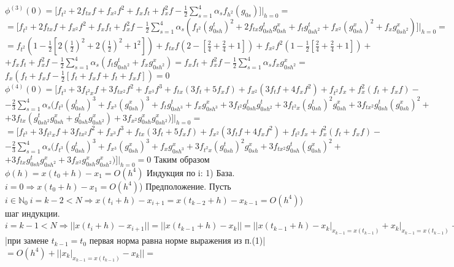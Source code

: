\documentclass[a4paper,14pt]{article}
\begin{document}
$\phi^{(3)}(0)=\bigg[f_{t^2}+2f_{tx}f+f_{x^2}f^2+f_xf_t+f_x^2f- \frac{1}{2}\sum\limits_{s=1}^{4}\alpha_sf_{h^2}(g_{0s})\bigg]\bigg|_{h=0}=$\newline
$=\bigg[f_{t^2}+2f_{tx}f+f_{x^2}f^2+f_xf_t+f_x^2f- \frac{1}{2}\sum\limits_{s=1}^{4}\alpha_s(f_{t^2}(g_{0sh}^t)^2+2f_{tx}g_{0sh}^tg_{0sh}^x+f_tg_{0sh^2}^t+f_{x^2}(g_{0sh}^x)^2+f_xg_{0sh^2}^x)\bigg]\bigg|_{h=0}=$\newline
$=f_{t^2}(1-\frac{1}{2}[2(\frac{1}{2})^2+2(\frac{1}{2})^2+1^2])+f_{tx}f(2-[\frac{2}{4}+\frac{2}{4}+1])+f_{x^2}f^2(1-\frac{1}{2}[\frac{2}{4}+\frac{2}{4}+1])+$\newline
$+f_xf_t+f_x^2f-\frac{1}{2}\sum\limits_{s=1}^{4}\alpha_s(f_tg_{0sh^2}^t+f_xg_{0sh^2}^x)=f_xf_t+f_x^2f-\frac{1}{2}\sum\limits_{s=1}^{4}\alpha_sf_xg_{0sh^2}^x=$\newline
$f_x(f_t+f_xf-\frac{1}{2}[f_t+f_xf+f_t+f_xf])=0$\newline
$\phi^{(4)}(0)=\bigg[f_{t^3}+3f_{t^2x}f+3f_{tx^2}f^2+f_{x^3}f^3+f_{tx}(3f_t+5f_xf)+f_{x^2}(3f_tf+4f_xf^2)+f_{t^2}f_{x}+f_x^2(f_t+f_xf)-$\newline
$-\frac{2}{3}\sum\limits_{s=1}^{4} \alpha_s(f_{t^3}(g_{0sh}^t)^3+f_{x^3}(g_{0sh}^x)^3+f_tg_{0sh^3}^t+f_xg_{0sh^3}^x+3f_{t^2}g_{0sh}^tg_{0sh^2}^t+3f_{t^2x}(g_{0sh}^t)^2g_{0sh}^x+3f_{tx^2}g_{0sh}^t(g_{0sh}^x)^2+$\newline
$+3f_{tx}(g_{0sh^2}^tg_{0sh}^x+g_{0sh}^tg_{0sh^2}^x)+3f_{x^2}g_{0sh}^xg_{0sh^2}^x)\bigg]\bigg|_{h=0}=$\newline
$=\bigg[f_{t^3}+3f_{t^2x}f+3f_{tx^2}f^2+f_{x^3}f^3+f_{tx}(3f_t+5f_xf)+f_{x^2}(3f_tf+4f_xf^2)+f_{t^2}f_{x}+f_x^2(f_t+f_xf)-$\newline
$-\frac{2}{3}\sum\limits_{s=1}^{4} \alpha_s(f_{t^3}(g_{0sh}^t)^3+f_{x^3}(g_{0sh}^x)^3+f_xg_{0sh^3}^x+3f_{t^2x}(g_{0sh}^t)^2g_{0sh}^x+3f_{tx^2}g_{0sh}^t(g_{0sh}^x)^2+$\newline
$+3f_{tx}g_{0sh}^tg_{0sh^2}^x+3f_{x^2}g_{0sh}^xg_{0sh^2}^x)\bigg]\bigg|_{h=0}=0$\newline
Таким образом $\phi(h)=x(t_0+h)-x_1=O(h^4)$\newline
Индукция по i:
1) База. $i=0 \Rightarrow x(t_0+h)-x_1=O(h^4)$) Предположение. Пусть $i\in \mathbb{N}_0\ i=k-2<N \Rightarrow x(t_i+h)-x_{i+1}=x(t_{k-2}+h)-x_{k-1}=O(h^4)$) шаг индукции. $i=k-1<N \Rightarrow ||x(t_i+h)-x_{i+1}||=||x(t_{k-1}+h)-x_{k}||=||x(t_{k-1}+h)-x_{k}\big|_{x_{k-1}=x(t_{k-1})}+x_{k}\big|_{x_{k-1}=x(t_{k-1})}-x_{k}||\leq||x(t_{k-1}+h)-x_{k}\big|_{x_{k-1}=x(t_{k-1})}||+||x_{k}\big|_{x_{k-1}=x(t_{k-1})}-x_{k}||=$|при замене $t_{k-1}=t_0$ первая норма равна норме выражения из п.(1)|$=O(h^4)+||x_{k}\big|_{x_{k-1}=x(t_{k-1})}-x_{k}||=$\newline
\end{document}
